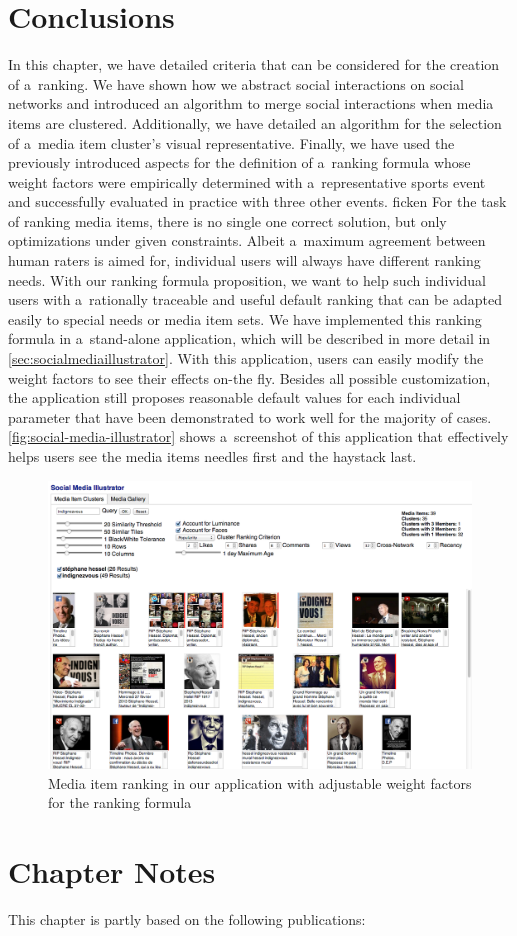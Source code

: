 \section{Conclusions}

In this chapter, we have detailed criteria
that can be considered for the creation of a~ranking.
We have shown how we abstract social interactions on social networks
and introduced an algorithm to merge social interactions
when media items are clustered.
Additionally, we have detailed an algorithm
for the selection of a~media item cluster's visual representative.
Finally, we have used the previously introduced aspects
for the definition of a~ranking formula
whose weight factors were empirically determined
with a~representative sports event
and successfully evaluated in practice with three other events.
ficken
For the task of ranking media items, there is no single one correct solution,
but only optimizations under given constraints.
Albeit a~maximum agreement between human raters is aimed for,
individual users will always have different ranking needs.
With our ranking formula proposition, we want to help
such individual users with a~rationally traceable and useful default ranking
that can be adapted easily to special needs or media item sets.
We have implemented this ranking formula in a~stand-alone application,%
which will be described in more detail in \autoref{sec:socialmediaillustrator}.
With this application,
users can easily modify the weight factors
to see their effects on-the fly.
Besides all possible customization,
the application still proposes reasonable default values
for each individual parameter that have been demonstrated
to work well for the majority of cases.
\autoref{fig:social-media-illustrator} shows a~screenshot of this application
that effectively helps users see the media items needles first
and the haystack last.

\begin{figure}[!ht]
  \centering
  \includegraphics[width=1.0\linewidth]{social-media-illustrator.png}
  \caption[Media item ranking in our application with adjustable weight factors]
  {Media item ranking in our application with adjustable weight factors for the ranking formula}
  \label{fig:social-media-illustrator}
\end{figure}


\section*{Chapter Notes}
This chapter is partly based on the following publications:



